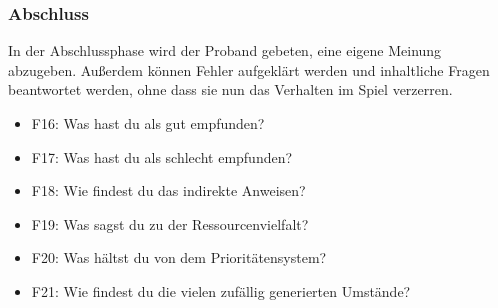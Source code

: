 \subsubsection{Abschluss}
In der Abschlussphase wird der Proband gebeten, eine eigene Meinung abzugeben. Außerdem können Fehler aufgeklärt werden und inhaltliche Fragen beantwortet werden, ohne dass sie nun das Verhalten im Spiel verzerren.

\begin{itemize}
    \item F16: Was hast du als gut empfunden?
    \item F17: Was hast du als schlecht empfunden?
    \item F18: Wie findest du das indirekte Anweisen?
    \item F19: Was sagst du zu der Ressourcenvielfalt?
    \item F20: Was hältst du von dem Prioritätensystem?
    \item F21: Wie findest du die vielen zufällig generierten Umstände?
\end{itemize}

